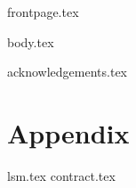\documentclass[11pt]{llncs}
\begin{document}
{frontpage.tex}

{body.tex}

\ifproceedings
\else
  \vfill
\fi
\iflncs
\thispagestyle{plain}
\fi

\ifccs
  
\else
  
\fi




\ifanonymous\else
  \ifproceedings
  \else
    \pagebreak
  \fi
{acknowledgements.tex}
\fi

\ifproceedings
{}
\iflncs
  \pagebreak
\fi

\else
  \section*{Appendix}
  \appendix
  {lsm.tex}
  {contract.tex}
\fi
\end{document}
